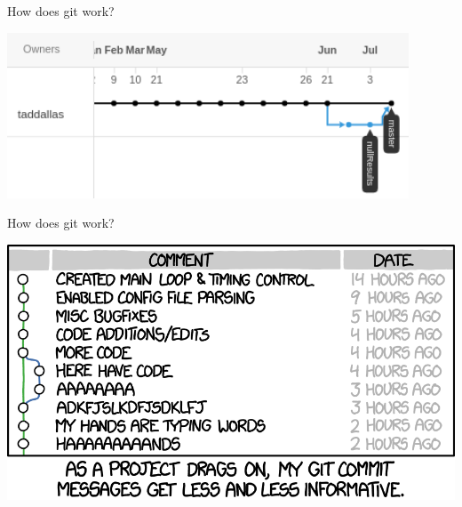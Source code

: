 \documentclass[12pt]{beamer}
\begin{document}
\begin{frame}

	\begin{flushright}
	\Large \textcolor{boss2}{How does git work?} 
	\end{flushright}

  \includegraphics[width=\textwidth]{figs/gitHistory.png}


\end{frame}





\begin{frame}

	\begin{flushright}
		\Large \textcolor{boss2}{How does git work?} 
	\end{flushright}

	\begin{center}
	  \includegraphics[width=\textwidth]{figs/commit.png}
	\end{center}

\end{frame}
\end{document}
